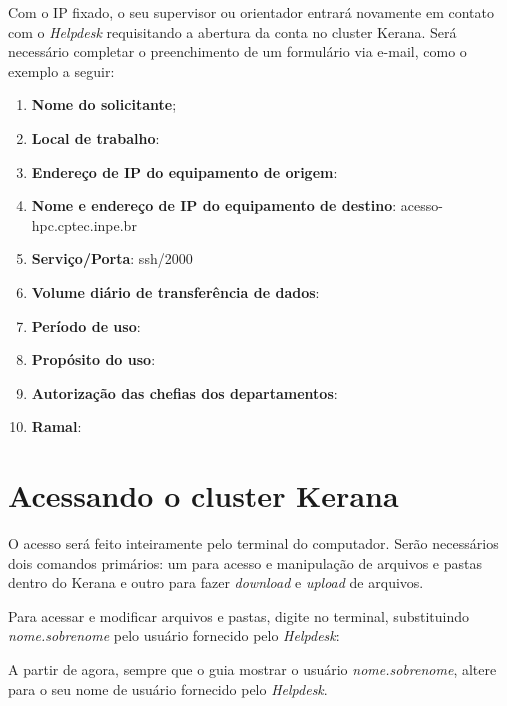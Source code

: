 \noindent Com o IP fixado, o seu supervisor ou orientador entrará novamente em contato com o \textit{Helpdesk} requisitando a abertura da 
          conta no cluster Kerana. Será necessário completar o preenchimento de um formulário via e-mail, como o exemplo a seguir:
\bigskip
\begin{enumerate}
\item \textbf{Nome do solicitante};
\item \textbf{Local de trabalho}:
\item \textbf{Endereço de IP do equipamento de origem}:
\item \textbf{Nome e endereço de IP do equipamento de destino}: acesso-hpc.cptec.inpe.br
\item \textbf{Serviço/Porta}: ssh/2000
\item \textbf{Volume diário de transferência de dados}:
\item \textbf{Período de uso}:
\item \textbf{Propósito do uso}:
\item \textbf{Autorização das chefias dos departamentos}:
\item \textbf{Ramal}:
\end{enumerate}
\bigskip

\section{Acessando o cluster Kerana}\label{keranaacess}
\bigskip

\noindent O acesso será feito inteiramente pelo terminal do computador. Serão necessários dois comandos primários: um para acesso e manipulação de arquivos e pastas dentro do Kerana e outro para fazer \textit{download} e \textit{upload} de arquivos.
\bigskip

\noindent Para acessar e modificar arquivos e pastas, digite no terminal, substituindo \textit{nome.sobrenome} pelo usuário fornecido pelo \textit{Helpdesk}:
\bigskip

\begin{tcolorbox}[enhanced,
  grow to left by   = 0cm,
  grow to right by  = 0cm,
  enlarge top by    = 0cm,
  enlarge bottom by = 0cm,
  tcbox raise base,
  boxrule           = 1.0pt,
  left              = 18mm,
  colframe          = red!50!black,coltext=red!25!black,colback=red!10!white,
  overlay           = {\begin{tcbclipinterior}\fill[red!75!blue!50!white] (frame.south west)
    rectangle node[text=white,font=\sffamily\bfseries\footnotesize,rotate=0] {ATENÇÃO} ([xshift=18mm]frame.north west);\end{tcbclipinterior}}]
A partir de agora, sempre que o guia mostrar o usuário \textit{nome.sobrenome}, altere para o seu nome de usuário fornecido pelo \textit{Helpdesk}.
\end{tcolorbox}
\bigskip


